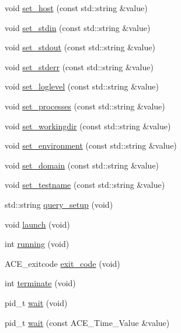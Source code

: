 \begin{DoxyCompactItemize}
void \hyperlink{classKATS__Process_aae625dfbd79c1e00e30b3c19197130a1}{set\_\-host} (const std::string \&value)
\item 
void \hyperlink{classKATS__Process_acde95270b2b715f3282169cbc55fb12c}{set\_\-stdin} (const std::string \&value)
\item 
void \hyperlink{classKATS__Process_a8e154dfd08a9dd52affb52d8e5d109e0}{set\_\-stdout} (const std::string \&value)
\item 
void \hyperlink{classKATS__Process_af599529fc19e3e91a63fae71f8ef915a}{set\_\-stderr} (const std::string \&value)
\item 
void \hyperlink{classKATS__Process_a93fedff66c4526da4aa640a173502f63}{set\_\-loglevel} (const std::string \&value)
\item 
void \hyperlink{classKATS__Process_a06349fc6340e92c19a250fb45cecc3ea}{set\_\-processes} (const std::string \&value)
\item 
void \hyperlink{classKATS__Process_ac382020f63760542683dfa2e9e63cbc4}{set\_\-workingdir} (const std::string \&value)
\item 
void \hyperlink{classKATS__Process_af825eb3107e356937e1978969a03e6c4}{set\_\-environment} (const std::string \&value)
\item 
void \hyperlink{classKATS__Process_aac5a4e2dbc371aec258b586b44919093}{set\_\-domain} (const std::string \&value)
\item 
void \hyperlink{classKATS__Process_aac52c6505338127510192278ad3e9f6b}{set\_\-testname} (const std::string \&value)
\item 
std::string \hyperlink{classKATS__Process_a06ecac6953b3323e070deb26eb42d4f3}{query\_\-setup} (void)
\item 
void \hyperlink{classKATS__Process_a4dbd986253bfc36a1000d93bdfdc39ed}{launch} (void)
\item 
int \hyperlink{classKATS__Process_ab850f6f94d349e5a46f43bb67f24ab6b}{running} (void)
\item 
ACE\_\-exitcode \hyperlink{classKATS__Process_a7ce23225fdabcc14193d26832da726a7}{exit\_\-code} (void)
\item 
int \hyperlink{classKATS__Process_ad0553f8bb8d0aa1e386e8a115f948d0c}{terminate} (void)
\item 
pid\_\-t \hyperlink{classKATS__Process_a4d91cec6b270e036069e2528d51c0dc5}{wait} (void)
\item 
pid\_\-t \hyperlink{classKATS__Process_a9da90c9eb28ddd2ea0e71a7e32eae4ec}{wait} (const ACE\_\-Time\_\-Value \&value)
\end{DoxyCompactItemize}
